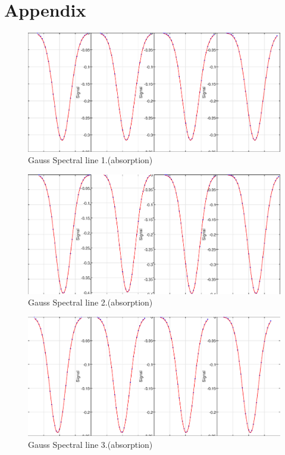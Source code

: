 \documentclass[12pt,oneside,a4paper,english]{article}
\begin{document}
\section{Appendix} \label{ch6}
\begin{figure}[H]
    \centering
    \includegraphics[width = 1\textwidth ]{figures/gaus_sl_1.eps}
    \caption{Gauss Spectral line 1.(absorption) }
    \label{fig:Figure 13}
\end{figure}
\begin{figure}[H]
    \centering
    \includegraphics[width = 1\textwidth ]{figures/gaus_sl_2.eps}
    \caption{Gauss Spectral line 2.(absorption) }
    \label{fig:Figure 14}
\end{figure}
\begin{figure}[H]
    \centering
    \includegraphics[width = 1\textwidth ]{figures/gaus_sl_3.eps}
    \caption{Gauss Spectral line 3.(absorption) }
    \label{fig:Figure 15}
\end{figure}
\end{document}
